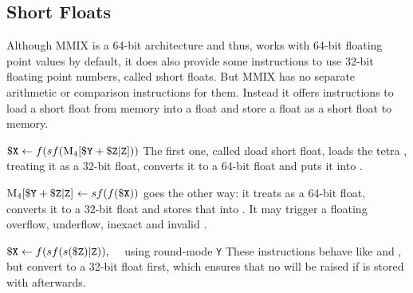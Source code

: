 \subsection{Short Floats}

Although MMIX is a 64-bit architecture and thus, works with 64-bit floating point values by default, it does also provide some instructions to use 32-bit floating point numbers, called \i{short floats}. But MMIX has no separate arithmetic or comparison instructions for them. Instead it offers instructions to load a short float from memory into a float and store a float as a short float to memory.

\instrtbl
	{}
	{$\dr{X} \leftarrow f(sf(\vmem{4}{\dr{Y} + \udrim{Z}}))$}
\noindent The first one, called \i{load short float}, loads the tetra , treating it as a 32-bit float, converts it to a 64-bit float and puts it into . \citep[pg. 20]{mmix-doc}

\instrtbl
	{}
	{$\vmem{4}{\dr{Y} + \udrim{Z}}~\leftarrow sf(f(\dr{X}))$}
\noindent {} goes the other way: it treats  as a 64-bit float, converts it to a 32-bit float and stores that into . It may trigger a floating overflow, underflow, inexact and invalid . \citep[pg. 20]{mmix-doc}

\instrtbl
	{}
	{${\tt \$X} \leftarrow f(sf(s({\tt \$Z}){\tt|Z})),\quad$ using round-mode {\tt Y}}
\noindent These instructions behave like  and , but convert  to a 32-bit float first, which ensures that no  will be raised if  is stored with  afterwards. \citep[pg. 20]{mmix-doc}


